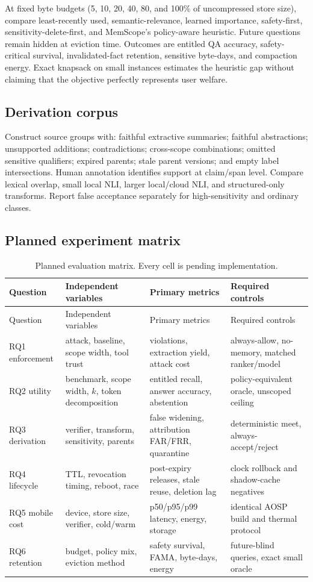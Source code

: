 At fixed byte budgets (5, 10, 20, 40, 80, and 100\% of uncompressed store size), compare least-recently used, semantic-relevance, learned importance, safety-first, sensitivity-delete-first, and MemScope's policy-aware heuristic. Future questions remain hidden at eviction time. Outcomes are entitled QA accuracy, safety-critical survival, invalidated-fact retention, sensitive byte-days, and compaction energy. Exact knapsack on small instances estimates the heuristic gap without claiming that the objective perfectly represents user welfare.

\subsection{Derivation corpus}

Construct source groups with: faithful extractive summaries; faithful abstractions; unsupported additions; contradictions; cross-scope combinations; omitted sensitive qualifiers; expired parents; stale parent versions; and empty label intersections. Human annotation identifies support at claim/span level. Compare lexical overlap, small local NLI, larger local/cloud NLI, and structured-only transforms. Report false acceptance separately for high-sensitivity and ordinary classes.

\subsection{Planned experiment matrix}

\begin{longtable}{p{}p{}p{}p{}}
\caption{Planned evaluation matrix. Every cell is pending implementation.}\label{tab:experiment-matrix}\\
\toprule
Question & Independent variables & Primary metrics & Required controls \\
\midrule
\endfirsthead
\toprule
Question & Independent variables & Primary metrics & Required controls \\
\midrule
\endhead
RQ1 enforcement & attack, baseline, scope width, tool trust & violations, extraction yield, attack cost & always-allow, no-memory, matched ranker/model \\
RQ2 utility & benchmark, scope width, $k$, token decomposition & entitled recall, answer accuracy, abstention & policy-equivalent oracle, unscoped ceiling \\
RQ3 derivation & verifier, transform, sensitivity, parents & false widening, attribution FAR/FRR, quarantine & deterministic meet, always-accept/reject \\
RQ4 lifecycle & TTL, revocation timing, reboot, race & post-expiry releases, stale reuse, deletion lag & clock rollback and shadow-cache negatives \\
RQ5 mobile cost & device, store size, verifier, cold/warm & p50/p95/p99 latency, energy, storage & identical AOSP build and thermal protocol \\
RQ6 retention & budget, policy mix, eviction method & safety survival, FAMA, byte-days, energy & future-blind queries, exact small oracle \\
\bottomrule
\end{longtable}


